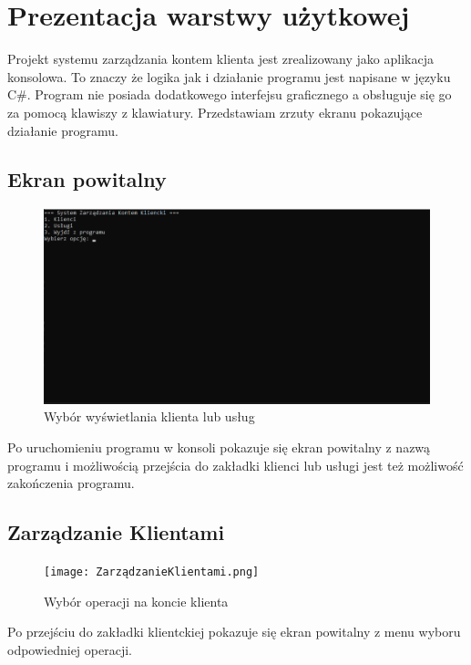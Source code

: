 \chapter{Prezentacja warstwy użytkowej}
Projekt systemu zarządzania kontem klienta jest zrealizowany jako aplikacja konsolowa. To znaczy że logika jak i działanie programu jest napisane w języku C\#. Program nie posiada dodatkowego interfejsu graficznego a obsługuje się go za pomocą klawiszy z klawiatury. 
Przedstawiam zrzuty ekranu pokazujące działanie programu.

\section{Ekran powitalny}

\begin{figure}[h]
    \centering
    \includegraphics[width=\textwidth]{EkranPow.png}
      \caption{Wybór wyświetlania klienta lub usług}
    \label{fig:example}
\end{figure}

Po uruchomieniu programu w konsoli pokazuje się ekran powitalny z nazwą programu i możliwością przejścia do zakładki klienci lub usługi jest też możliwość zakończenia programu. 

\newpage

\section{Zarządzanie Klientami}

\begin{figure}[h]
    \centering
    \texttt{[image: ZarządzanieKlientami.png]}
      \caption{Wybór operacji na koncie klienta}
    \label{fig:example}
\end{figure}

Po przejściu do zakładki klientckiej pokazuje się ekran powitalny z menu wyboru odpowiedniej operacji. 


